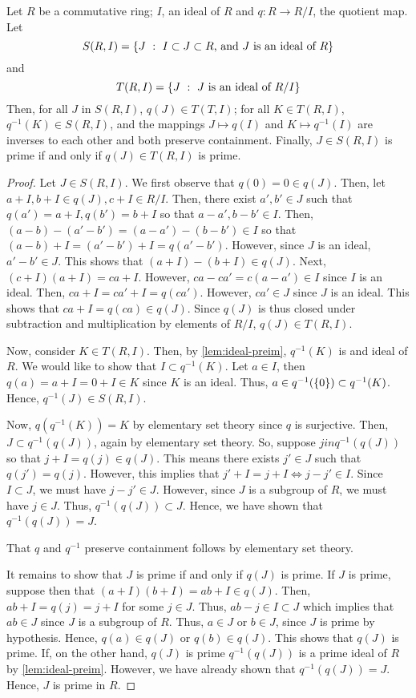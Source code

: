 \begin{thm}\label{thm:correspondence-cring}
Let $R$ be a commutative ring; $I$, an ideal of $R$ and $q : R \to R/I$,
the quotient map. Let
\[
S(R, I) = \set[J]{I \subset J \subset R \text{, and $J$ is an ideal of } R}
\]
and
\[
T(R, I) = \set[J]{J \text{ is an ideal of } R/I}
\]
Then, for all $J$ in $S(R, I)$, $q(J) \in T(T, I)$;
for all $K \in T(R, I)$, $q^{-1}(K) \in S(R, I)$, and
the mappings $J \mapsto q(I)$ and $K \mapsto q^{-1}(I)$ are inverses
to each other and both preserve containment.
Finally, $J \in S(R, I)$ is prime if and only if
$q(J) \in T(R, I)$ is prime.
\end{thm}
\begin{proof}
Let $J \in S(R, I)$.
We first observe that $q(0) = 0 \in q(J)$.
Then, let $a + I, b + I \in q(J), c + I \in R/I$.
Then, there exist $a', b' \in J$ such that $q(a') = a + I, q(b') = b + I$
so that $a - a', b - b' \in I$. Then,
$(a - b) - (a' - b') = (a - a') - (b - b') \in I$ so that
$(a - b) + I = (a' - b') + I = q(a' - b')$. However,
since $J$ is an ideal, $a' - b' \in J$. This shows that
$(a + I) - (b + I) \in q(J)$. Next, $(c + I)(a +I) = ca + I$.
However, $ca - ca' = c(a - a') \in I$ since $I$ is an ideal.
Then, $ca + I = ca' + I = q(ca')$. However, $ca' \in J$ since $J$
is an ideal. This shows that $ca + I = q(ca) \in q(J)$.
Since $q(J)$ is thus closed under subtraction and multiplication
by elements of $R/I$, $q(J) \in T(R, I)$.

Now, consider $K \in T(R, I)$. Then, by \cref{lem:ideal-preim},
$q^{-1}(K)$ is and ideal of $R$. We would like to show that
$I \subset q^{-1}(K)$. Let $a \in I$, then $q(a) = a + I = 0 + I \in K$
since $K$ is an ideal. Thus, $a \in q^{-1}(\set{0}) \subset q^{-1}(K)$.
Hence, $q^{-1}(J) \in S(R, I)$.

Now, $q(q^{-1}(K)) = K$ by elementary set theory since $q$ is surjective.
Then, $J \subset q^{-1}(q(J))$, again by elementary set theory.
So, suppose $j in q^{-1}(q(J))$ so that $j + I = q(j) \in q(J)$.
This means there exists $j' \in J$ such that $q(j') = q(j)$. However,
this implies that $j' + I = j + I \iff j - j' \in I$. Since
$I \subset J$, we must have $j - j' \in J$. However, since $J$ is a
subgroup of $R$, we must have $j \in J$. Thus, $q^{-1}(q(J)) \subset J$.
Hence, we have shown that $q^{-1}(q(J)) = J$.

That $q$ and $q^{-1}$ preserve containment follows by elementary set theory.

It remains to show that $J$ is prime if and only if $q(J)$ is prime.
If $J$ is prime, suppose then that $(a + I)(b + I) = ab + I \in q(J)$.
Then, $ab + I = q(j) = j + I$ for some $j \in J$. Thus,
$ab - j \in I \subset J$ which implies that $ab \in J$ since $J$
is a subgroup of $R$. Thus, $a \in J$ or $b \in J$, since $J$ is prime
by hypothesis. Hence, $q(a) \in q(J)$ or $q(b) \in q(J)$. This shows
that $q(J)$ is prime.
If, on the other hand, $q(J)$ is prime $q^{-1}(q(J))$ is a prime
ideal of $R$ by \cref{lem:ideal-preim}. However, we have already shown
that $q^{-1}(q(J)) = J$. Hence, $J$ is prime in $R$.
\end{proof}

